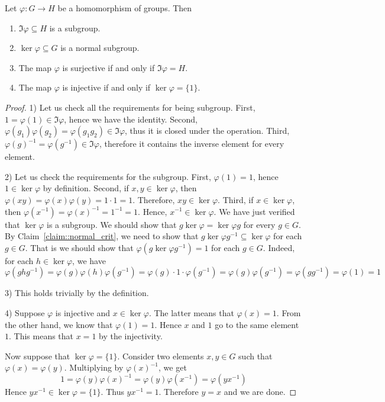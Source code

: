 \begin{claim}
\label{claim::HomProp}
Let $\varphi\colon G\to H$ be a homomorphism of groups.
Then
\begin{enumerate}
\item $\Im \varphi \subseteq H$  is a subgroup.

\item $\ker \varphi \subseteq G$ is a normal subgroup.

\item The map $\varphi$ is surjective if and  only if $\Im \varphi = H$.

\item The map $\varphi$ is injective if and only if $\ker \varphi  = \{1\}$.
\end{enumerate}
\end{claim}
\begin{proof}
1) Let us check all the requirements for being subgroup.
First, $1 = \varphi(1) \in \Im \varphi$, hence we have the identity.
Second, $\varphi(g_1)\varphi(g_2) = \varphi(g_1 g_2) \in \Im\varphi$, thus it is closed under the operation.
Third, $\varphi(g)^{-1} = \varphi(g^{-1}) \in \Im\varphi$, therefore it contains the inverse element for every element.

2) Let us check the requirements for the subgroup.
First, $\varphi(1) = 1$, hence $1 \in \ker \varphi$ by definition.
Second, if $x, y\in \ker \varphi$, then $\varphi(xy) = \varphi(x) \varphi(y) = 1\cdot 1 = 1$.
Therefore, $xy\in \ker\varphi$.
Third, if $x\in \ker\varphi$, then $\varphi(x^{-1}) = \varphi(x)^{-1} = 1^{-1} = 1$.
Hence, $x^{-1}\in \ker\varphi$.
We have just verified that $\ker \varphi$ is a subgroup.
We should show that $g \ker \varphi = \ker \varphi g$ for every $g\in G$.
By Claim~\ref{claim::normal_crit}, we need to show that $g\ker \varphi g^{-1}\subseteq \ker \varphi$ for each $g\in G$.
That is we should show that $\varphi(g \ker \varphi g^{-1}) = 1$ for each $g\in G$.
Indeed, for each $h\in \ker \varphi$, we have
\[
\varphi(g h g^{-1}) = \varphi(g) \varphi(h) \varphi(g^{-1}) = \varphi(g) \cdot 1 \cdot \varphi(g^{-1}) = \varphi(g) \varphi(g^{-1}) = \varphi(g g^{-1}) = \varphi(1) = 1
\]


3) This holds trivially by the definition.

4) Suppose $\varphi$ is injective and $x\in \ker\varphi$.
The latter means that $\varphi(x) = 1$.
From the other hand, we know that $\varphi(1) = 1$.
Hence $x$ and $1$ go to the same element $1$.
This means that $x = 1$ by the injectivity.

Now suppose that $\ker \varphi = \{1\}$.
Consider two elements $x, y\in G$ such that $\varphi(x) = \varphi(y)$.
Multiplying by $\varphi(x)^{-1}$, we get
\[
1 = \varphi(y) \varphi(x)^{-1} = \varphi(y) \varphi(x^{-1}) = \varphi(yx^{-1})
\]
Hence $yx^{-1}\in\ker\varphi = \{1\}$.
Thus $y x^{-1} = 1$.
Therefore $y = x$ and we are done.
\end{proof}

